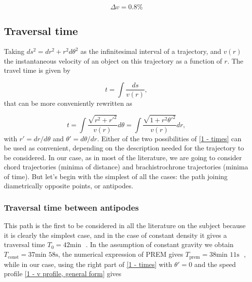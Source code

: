 \documentclass[aps,twocolumn,showpacs,preprintnumbers]{revtex4}
\begin{document}
    \begin{equation*}
        \Delta v = 0.8 \%
    \end{equation*}
    
    
    
    \subsection{Traversal time}\label{time section}
        
    Taking $ ds ^ 2 = dr ^ 2 + r ^ 2 d \theta ^ 2 $ as the infinitesimal interval of a trajectory, and $ v (r) $ the instantaneous velocity of an object on this trajectory as a function of $ r $. The travel time is given by
   
            
    \begin{equation*}
        t = \int \frac{ds}{v(r)},
    \end{equation*}
    that can be more conveniently rewritten as
            
    \begin{equation}
        t = \int \frac{\sqrt{r^2 + {r'}^2}}{v(r)} d\theta = \int \frac{\sqrt{ 1 + r^2 {\theta'}^2}}{v(r)} dr, 
        \label{1 - times}
    \end{equation}
    with $ {r '} = dr / d \theta $ and $ \theta' = d \theta / dr $. Either of the two possibilities of \eqref{1 - times} can be used as convenient, depending on the description needed for the trajectory to be considered. In our case, as in most of the literature, we are going to consider chord trajectories (minima of distance) and brachistrochrone trajectories (minima of time). But let's begin with the simplest of all the cases: the path joining diametrically opposite points, or antipodes.

        \subsubsection{Traversal time between antipodes}
    
        This path is the first to be considered in all the literature on the subject because it is clearly the simplest case, and in the case of constant density it gives a traversal time $ T_0 = 42 \text{min } $ \citep{History-Tunels}. In the assumption of constant gravity we obtain $ T_{\text{const}} = 37 \text{min } 58 \text{s} $, the numerical expression of PREM gives $ T_{\text {prem}} = 38 \text{min } 11 \text{s } $ \cite{gravity-train-prem}, while in our case, using the right part of \eqref{1 - times} with $ \theta'= 0 $ and the speed profile \eqref{1 - v profile, general form} gives
        
\end{document}
